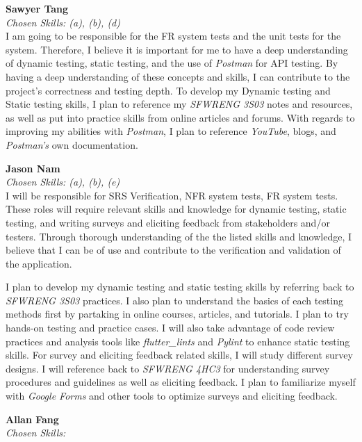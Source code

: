 \documentclass[12pt, titlepage]{article}
\begin{document}
\begin{enumerate}
  \medskip
  \textbf{Sawyer Tang}\\
  \textit{Chosen Skills: (a), (b), (d)} \\
  I am going to be responsible for the FR system tests and the unit tests for the system. Therefore, I believe it is important for me to have a deep understanding of dynamic testing, static testing, and the use of \textit{Postman} for API testing. By having a deep understanding of these concepts and skills, I can contribute to the project's correctness and testing depth.
  To develop my Dynamic testing and Static testing skills, I plan to reference my \textit{SFWRENG 3S03} notes and resources, as well as put into practice skills from online articles and forums. With regards to improving my abilities with \textit{Postman}, I plan to reference \textit{YouTube}, blogs, and \textit{Postman's} own documentation.

  \medskip
  \textbf{Jason Nam}\\
  \textit{Chosen Skills: (a), (b), (e)}\\
  I will be responsible for SRS Verification, NFR system tests, FR system tests. These roles will require relevant skills and knowledge for dynamic testing, static testing, and writing surveys and eliciting feedback from stakeholders and/or testers. Through thorough understanding of the the listed skills and knowledge, I believe that I can be of use and contribute to the verification and validation of the application.\par
  I plan to develop my dynamic testing and static testing skills by referring back to \textit{SFWRENG 3S03} practices. I also plan to understand the basics of each testing methods first by partaking in online courses, articles, and tutorials. I plan to try hands-on testing and practice cases. I will also take advantage of code review practices and analysis tools like \textit{flutter\_lints} and \textit{Pylint} to enhance static testing skills. For survey and eliciting feedback related skills, I will study different survey designs. I will reference back to \textit{SFWRENG 4HC3} for understanding survey procedures and guidelines as well as eliciting feedback. I plan to familiarize myself with \textit{Google Forms} and other tools to optimize surveys and eliciting feedback.

  \medskip
  \textbf{Allan Fang}\\
  \textit{Chosen Skills: } \\
\end{enumerate}
\end{document}
